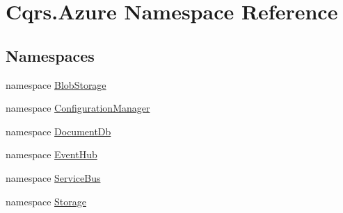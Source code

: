 \hypertarget{namespaceCqrs_1_1Azure}{}\section{Cqrs.\+Azure Namespace Reference}
\label{namespaceCqrs_1_1Azure}
\subsection*{Namespaces}
\begin{DoxyCompactItemize}
\item 
namespace \hyperlink{namespaceCqrs_1_1Azure_1_1BlobStorage}{Blob\+Storage}
\item 
namespace \hyperlink{namespaceCqrs_1_1Azure_1_1ConfigurationManager}{Configuration\+Manager}
\item 
namespace \hyperlink{namespaceCqrs_1_1Azure_1_1DocumentDb}{Document\+Db}
\item 
namespace \hyperlink{namespaceCqrs_1_1Azure_1_1EventHub}{Event\+Hub}
\item 
namespace \hyperlink{namespaceCqrs_1_1Azure_1_1ServiceBus}{Service\+Bus}
\item 
namespace \hyperlink{namespaceCqrs_1_1Azure_1_1Storage}{Storage}
\end{DoxyCompactItemize}
